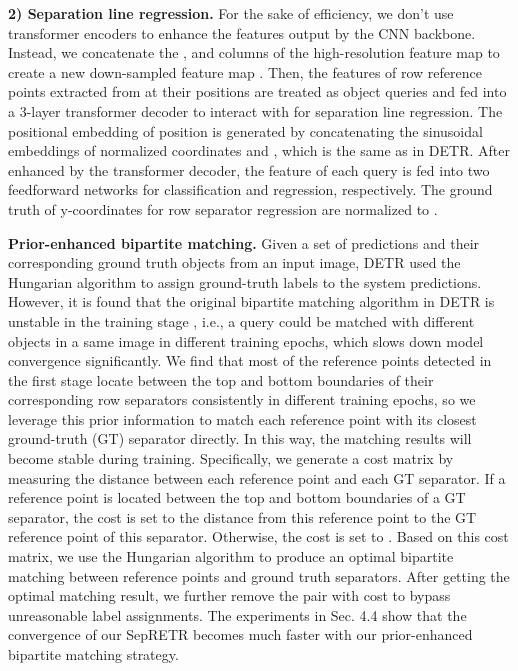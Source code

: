 \documentclass[sigconf]{acmart}
\begin{document}
\textbf{2) Separation line regression.} For the sake of efficiency, we don't use transformer encoders to enhance the features output by the CNN backbone. Instead, we concatenate the , and  columns of the high-resolution feature map  to create a new down-sampled feature map . Then, the features of row reference points extracted from  at their positions are treated as object queries and fed into a 3-layer transformer decoder to interact with  for separation line regression. The positional embedding of position  is generated by concatenating the sinusoidal embeddings of normalized coordinates  and , which is the same as in DETR. After enhanced by the transformer decoder, the feature of each query is fed into two feedforward networks for classification and regression, respectively. The ground truth of y-coordinates for row separator regression are normalized to .

\textbf{Prior-enhanced bipartite matching.} Given a set of predictions and their corresponding ground truth objects from an input image, DETR used the Hungarian algorithm to assign ground-truth labels to the system predictions. However, it is found that the original bipartite matching algorithm in DETR is unstable in the training stage \cite{li2022dn}, i.e., a query could be matched with different objects in a same image in different training epochs, which slows down model convergence significantly. We find that most of the reference points detected in the first stage locate between the top and bottom boundaries of their corresponding row separators consistently in different training epochs, so we leverage this prior information to match each reference point with its closest ground-truth (GT) separator directly. In this way, the matching results will become stable during training. Specifically, we generate a cost matrix by measuring the distance between each reference point and each GT separator. If a reference point is located between the top and bottom boundaries of a GT separator, the cost is set to the distance from this reference point to the GT reference point of this separator. Otherwise, the cost is set to . Based on this cost matrix, we use the Hungarian algorithm to produce an optimal bipartite matching between reference points and ground truth separators. After getting the optimal matching result, we further remove the pair with cost  to bypass unreasonable label assignments. The experiments in Sec. 4.4 show that the convergence of our SepRETR becomes much faster with our prior-enhanced bipartite matching strategy.
\end{document}
